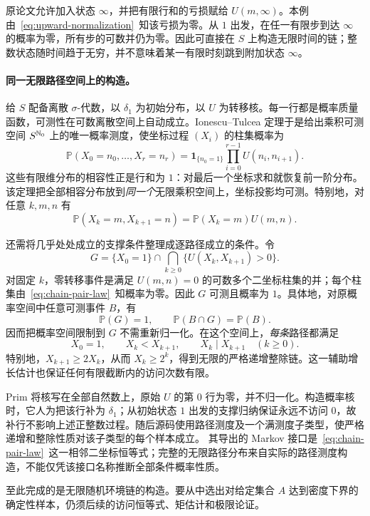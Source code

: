原论文\cite[Definition 2.9, Example 2.11]{alexeev2026}允许加入状态 $\infty$，并把有限行和的亏损赋给 $U(m,\infty)$。本例由~\eqref{eq:upward-normalization}~知该亏损为零。从 $1$ 出发，在任一有限步到达 $\infty$ 的概率为零，所有步的可数并仍为零。因此可直接在 $S$ 上构造无限时间的链；整数状态随时间趋于无穷，并不意味着某一有限时刻跳到附加状态 $\infty$。

\paragraph{同一无限路径空间上的构造。}
给 $S$ 配备离散 $\sigma$-代数，以 $\delta_1$ 为初始分布，以 $U$ 为转移核。每一行都是概率质量函数，可测性在可数离散空间上自动成立。Ionescu--Tulcea 定理于是给出乘积可测空间 $S^{\mathbb N_0}$ 上的唯一概率测度，使坐标过程 $(X_i)$ 的柱集概率为
\begin{equation}\label{eq:chain-cylinders}
 \mathbb P(X_0=n_0,\ldots,X_r=n_r)
 =\mathbf1_{\{n_0=1\}}\prod_{i=0}^{r-1}U(n_i,n_{i+1}).
\end{equation}
这些有限维分布的相容性正是行和为 $1$：对最后一个坐标求和就恢复前一阶分布。该定理把全部相容分布放到\emph{同一个}无限乘积空间上，坐标投影均可测。特别地，对任意 $k,m,n$ 有
\begin{equation}\label{eq:chain-pair-law}
 \mathbb P(X_k=m,X_{k+1}=n)=\mathbb P(X_k=m)U(m,n).
\end{equation}

还需将几乎处处成立的支撑条件整理成逐路径成立的条件。令
\[
 G=\{X_0=1\}\cap\bigcap_{k\ge0}\{U(X_k,X_{k+1})>0\}.
\]
对固定 $k$，零转移事件是满足 $U(m,n)=0$ 的可数多个二坐标柱集的并；每个柱集由~\eqref{eq:chain-pair-law}~知概率为零。因此 $G$ 可测且概率为 $1$。具体地，对原概率空间中任意可测事件 $B$，有
\[
 \mathbb P(G)=1,\qquad \mathbb P(B\cap G)=\mathbb P(B).
\]
因而把概率空间限制到 $G$ 不需重新归一化。在这个空间上，\emph{每条}路径都满足
\[
 X_0=1,\qquad X_k<X_{k+1},\qquad X_k\mid X_{k+1}\quad(k\ge0).
\]
特别地，$X_{k+1}\ge2X_k$，从而 $X_k\ge2^k$，得到无限的严格递增整除链。这一辅助增长估计也保证任何有限截断内的访问次数有限。

Prim 将核写在全部自然数上，原始 $U$ 的第 $0$ 行为零，并不归一化。构造概率核时，它人为把该行补为 $\delta_1$；从初始状态 $1$ 出发的支撑归纳保证永远不访问 $0$，故补行不影响上述正整数过程。随后源码使用路径测度及一个满测度子类型，使严格递增和整除性质对该子类型的每个样本成立。
其导出的 Markov 接口是~\eqref{eq:chain-pair-law}~这一相邻二坐标恒等式；完整的无限路径分布来自实际的路径测度构造，不能仅凭该接口名称推断全部条件概率性质。

至此完成的是无限随机环境链的构造。要从中选出对给定集合 $A$ 达到密度下界的确定性样本，仍须后续的访问恒等式、矩估计和极限论证。

